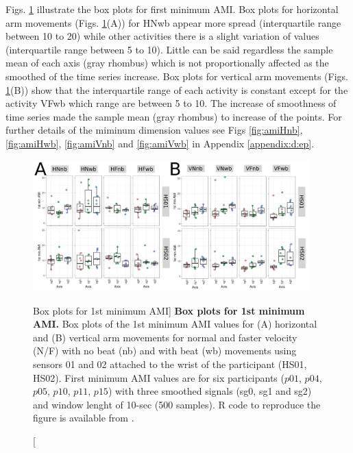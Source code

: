 Figs. \ref{fig:AMI-hii} illustrate the box plots for first minimum AMI.
Box plots for horizontal arm movements (Figs. \ref{fig:AMI-hii}(A)) for 
HNwb appear more spread (interquartile range between 10 to 20) while 
other activities there is a slight variation of values 
(interquartile range between 5 to 10).
Little can be said regardless the sample mean of each axis (gray rhombus) 
which is not proportionally affected as the smoothed of the time series 
increase.
Box plots for vertical arm movements (Figs. \ref{fig:AMI-hii}(B)) 
show that the interquartile range of each activity is constant
except for the activity VFwb which range are between 5 to 10.
The increase of smoothness of time series made the sample mean 
(gray rhombus) to increase of the points.
For further details of the miminum dimension values see 
Figs \ref{fig:amiHnb}, \ref{fig:amiHwb}, \ref{fig:amiVnb} and \ref{fig:amiVwb}
in Appendix \ref{appendix:d:ep}.
\begin{figure}
\centering
\includegraphics[width=0.95\textwidth]{AMI}
	\caption
	[Box plots for 1st minimum AMI]{
	{\bf Box plots for 1st minimum AMI.} 
		Box plots of the 1st minimum AMI values for 
		(A) horizontal and (B) vertical arm movements for
		normal and faster velocity (N/F) with no beat (nb) 
		and with beat (wb) movements
		using sensors 01 and 02 attached to the wrist of the 
		participant (HS01, HS02).
		First minimum AMI values are for six participants 
		($p01$, $p04$, $p05$, $p10$, $p11$, $p15$) with three 
		smoothed signals (sg0, sg1 and sg2)
		and window lenght of 10-sec (500 samples).
		R code to reproduce the figure is available 
		from \cite{hwum2018}.
        }
    \label{fig:AMI-hii}
\end{figure}





